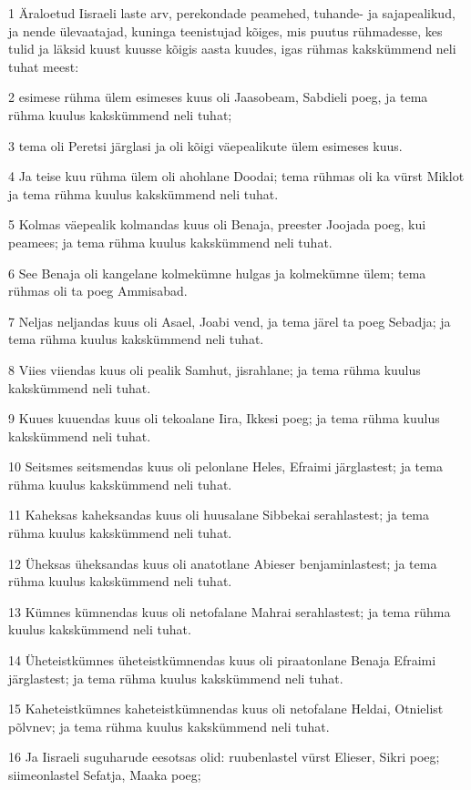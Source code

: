\par 1 Äraloetud Iisraeli laste arv, perekondade peamehed, tuhande- ja sajapealikud, ja nende ülevaatajad, kuninga teenistujad kõiges, mis puutus rühmadesse, kes tulid ja läksid kuust kuusse kõigis aasta kuudes, igas rühmas kakskümmend neli tuhat meest:
\par 2 esimese rühma ülem esimeses kuus oli Jaasobeam, Sabdieli poeg, ja tema rühma kuulus kakskümmend neli tuhat;
\par 3 tema oli Peretsi järglasi ja oli kõigi väepealikute ülem esimeses kuus.
\par 4 Ja teise kuu rühma ülem oli ahohlane Doodai; tema rühmas oli ka vürst Miklot ja tema rühma kuulus kakskümmend neli tuhat.
\par 5 Kolmas väepealik kolmandas kuus oli Benaja, preester Joojada poeg, kui peamees; ja tema rühma kuulus kakskümmend neli tuhat.
\par 6 See Benaja oli kangelane kolmekümne hulgas ja kolmekümne ülem; tema rühmas oli ta poeg Ammisabad.
\par 7 Neljas neljandas kuus oli Asael, Joabi vend, ja tema järel ta poeg Sebadja; ja tema rühma kuulus kakskümmend neli tuhat.
\par 8 Viies viiendas kuus oli pealik Samhut, jisrahlane; ja tema rühma kuulus kakskümmend neli tuhat.
\par 9 Kuues kuuendas kuus oli tekoalane Iira, Ikkesi poeg; ja tema rühma kuulus kakskümmend neli tuhat.
\par 10 Seitsmes seitsmendas kuus oli pelonlane Heles, Efraimi järglastest; ja tema rühma kuulus kakskümmend neli tuhat.
\par 11 Kaheksas kaheksandas kuus oli huusalane Sibbekai serahlastest; ja tema rühma kuulus kakskümmend neli tuhat.
\par 12 Üheksas üheksandas kuus oli anatotlane Abieser benjaminlastest; ja tema rühma kuulus kakskümmend neli tuhat.
\par 13 Kümnes kümnendas kuus oli netofalane Mahrai serahlastest; ja tema rühma kuulus kakskümmend neli tuhat.
\par 14 Üheteistkümnes üheteistkümnendas kuus oli piraatonlane Benaja Efraimi järglastest; ja tema rühma kuulus kakskümmend neli tuhat.
\par 15 Kaheteistkümnes kaheteistkümnendas kuus oli netofalane Heldai, Otnielist põlvnev; ja tema rühma kuulus kakskümmend neli tuhat.
\par 16 Ja Iisraeli suguharude eesotsas olid: ruubenlastel vürst Elieser, Sikri poeg; siimeonlastel Sefatja, Maaka poeg;
